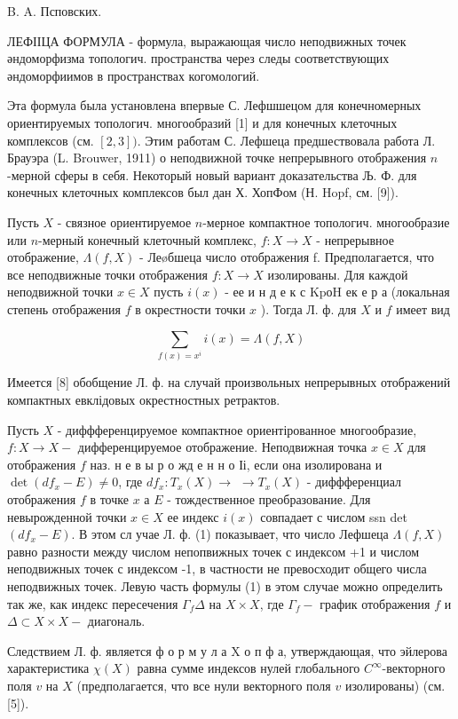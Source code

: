 \documentclass[10pt]{article}
\begin{document}
B. A. Псповских.



ЛЕФІІЦА ФОРМУЛА - формула, выражающая число неподвижных точек әндоморфизма топологич. пространства через следы соответствующих әндоморфиимов в пространствах когомологий.



Эта формула была установлена впервые С. Лефшшецом для конечномерных ориентируемых топологич. многообразий [1] и для конечных клеточных комплексов (см. $[2,3])$. Этим работам С. Лефшеца предшествовала работа Л. Брауэра (L. Brouwer, 1911) о неподвижной точке непрерывного отображения $n$-мерной сферы в себя. Некоторый новый вариант доказательства Љ. Ф. для конечных клеточных комплексов был дан Х. ХопФом (Н. Hopf, см. [9]).



Пусть $X$ - связное ориентируемое $n$-мерное компактное топологич. многообразие или $n$-мерный конечный клеточный комплекс, $f: X \rightarrow X$ - непрерывное отображение, $\Lambda(f, X)$ - Леøбшеца число отображения f. Предполагается, что все неподвижные точки отображения $f: X \rightarrow X$ изолированы. Для каждой неподвижной точки $x \in X$ пусть $i(x)$ - ее и н д е к с $\mathrm{K} \mathrm{p} о \mathrm{H}$ ек е р а (локальная степень отображения $f$ в окрестности точки $x$ ). Тогда Л. ф. для $X$ и $f$ имеет вид



\[

\sum_{f(x)=x^{i}} i(x)=\Lambda(f, X)

\]



Имеется [8] обобщение Л. ф. на случай произвольных непрерывных отображений компактных евклідовых окрестностных ретрактов.



Пусть $X$ - диффференцируемое компактное ориентірованное многообразие, $f: X \rightarrow X-$ дифференцируемое отображение. Неподвижная точка $x \in X$ для отображения $f$ наз. н е в ы р о жд е н н о Іі, если она изолирована и $\operatorname{det}\left(d f_{x}-E\right) \neq 0$, где $d f_{x}: T_{x}(X) \rightarrow$ $\rightarrow T_{x}(X)$ - диффференциал отображения $f$ в точке $x$ а $E$ - тождественное преобразование. Для невырожденной точки $x \in X$ ее индекс $i(x)$ совпадает с числом ssn det $\left(d f_{x}-E\right)$. В этом сл учае Л. ф. (1) показывает, что число Лефшеца $\Lambda(f, X)$ равно разности между числом непопвижных точек с индексом +1 и числом неподвижных точек с индексом -1, в частности не превосходит общего числа неподвижных точек. Левую часть формулы (1) в этом случае можно определить так же, как индекс пересечения $\Gamma_{f} \Delta$ на $X \times X$, где $\Gamma_{f}-$ график отображения $f$ и $\Delta \subset X \times X-$ диагональ.



Следствием Л. ф. является ф о р м у л а X о п ф а, утверждающая, что эйлерова характеристика $\chi(X)$ равна сумме индексов нулей глобального $C^{\infty}$-векторного поля $v$ на $X$ (предполагается, что все нули векторного поля $v$ изолированы) (см. [5]).
\end{document}
